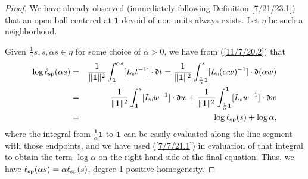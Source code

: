 \documentclass{amsart}
\numberwithin{equation}{section}
\theoremstyle{definition}
\numberwithin{theorem}{section}
\begin{document}
\begin{proof} We have already observed (immediately following Definition \ref{7/21/23.1}) that an open ball centered at $\mathbf{1}$ devoid of non-units always exists.  Let $\eta$  be such a neighborhood.

Given $\frac{1}{\alpha}s,s,\alpha s\in\eta$ for some choice of $\alpha>0$, we have from (\ref{11/7/20.2}) that
\begin{eqnarray}\nonumber  \log\ell_{\rm sp}(\alpha s) &=&  \frac{1}{\|{\bf 1}\|^2}\int_{\bf 1}^{\alpha s} [L_{\shortparallel}t^{-1}]\cdot \mathfrak{d}t = \frac{1}{\|{\bf 1}\|^2}\int_{\frac{\mathbf{1}}{\alpha}\mathbf{1}}^{s} [L_{\shortparallel}(\alpha w)^{-1}]\cdot \mathfrak{d}(\alpha w)  \\ \nonumber &=&  \frac{1}{\|{\bf 1}\|^2}\int_{\mathbf{1}}^{s} [L_{\shortparallel}w^{-1}]\cdot \mathfrak{d}w + \frac{1}{\|{\bf 1}\|^2}\int_{\frac{\mathbf{1}}{\alpha} \mathbf{1}}^{\mathbf{1}} [L_{\shortparallel}w^{-1}]\cdot \mathfrak{d}w  \\ &=& \log \ell_{\rm sp}(s) + \log\alpha, \label{4/2/23.1}
\end{eqnarray} where the integral from $\frac{\mathbf{1}}{\alpha} \mathbf{1}$ to $\mathbf{1}$ can be easily evaluated along the line segment with those endpoints, and we have used (\ref{7/7/21.1}) in evaluation of that integral to  obtain the term $\log \alpha$ on the right-hand-side of the final equation.  Thus, we have $\ell_{\rm sp}(\alpha s) = \alpha\ell_{\rm sp}(s)$, degree-1 positive homogeneity.



\end{proof}
\end{document}
